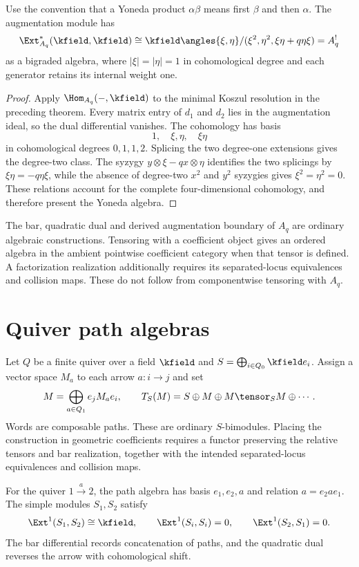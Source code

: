 \begin{theorem}
Use the convention that a Yoneda product $\alpha\beta$ means first $\beta$ and then $\alpha$. The augmentation module has
\[
 \Ext^*_{A_q}(\kfield,\kfield)
 \cong
 \kfield\angles{\xi,\eta}/(\xi^2,\eta^2,\xi\eta+q\eta\xi)
 =A_q^!
\]
as a bigraded algebra, where $|\xi|=|\eta|=1$ in cohomological degree and each generator retains its internal weight one.
\end{theorem}
\begin{proof}
Apply $\Hom_{A_q}(-,\kfield)$ to the minimal Koszul resolution in the preceding theorem. Every matrix entry of $d_1$ and $d_2$ lies in the augmentation ideal, so the dual differential vanishes. The cohomology has basis
\[
 1,\quad \xi,\eta,\quad \xi\eta
\]
in cohomological degrees $0,1,1,2$. Splicing the two degree-one extensions gives the degree-two class. The syzygy $y\otimes\xi-qx\otimes\eta$ identifies the two splicings by
$\xi\eta=-q\eta\xi$, while the absence of degree-two $x^2$ and $y^2$ syzygies gives $\xi^2=\eta^2=0$. These relations account for the complete four-dimensional cohomology, and therefore present the Yoneda algebra.
\end{proof}

The bar, quadratic dual and derived augmentation boundary of $A_q$ are
ordinary algebraic constructions.
Tensoring with a coefficient object gives an ordered algebra in the
ambient pointwise coefficient category when that tensor is defined.
A factorization realization additionally requires its separated-locus
equivalences and collision maps. These do not follow from componentwise
tensoring with $A_q$.

\chapter{Quiver path algebras}
Let $Q$ be a finite quiver over a field $\kfield$ and
$S=\bigoplus_{i\in Q_0}\kfield e_i$.
Assign a vector space $M_a$ to each arrow $a:i\to j$ and set
\[
 M=\bigoplus_{a\in Q_1}e_jM_ae_i,
 \qquad
 T_S(M)=S\oplus M\oplus M\tensor_S M\oplus\cdots.
\]
Words are composable paths. These are ordinary $S$-bimodules.
Placing the construction in geometric coefficients requires a functor
preserving the relative tensors and bar realization, together with
the intended separated-locus equivalences and collision maps.

For the quiver $1\xrightarrow{a}2$, the path algebra has basis $e_1,e_2,a$ and relation $a=e_2ae_1$. The simple modules $S_1,S_2$ satisfy
\[
 \Ext^1(S_1,S_2)\cong\kfield,
 \qquad
 \Ext^1(S_i,S_i)=0,
 \qquad
 \Ext^1(S_2,S_1)=0.
\]
The bar differential records concatenation of paths, and the quadratic dual reverses the arrow with cohomological shift.

